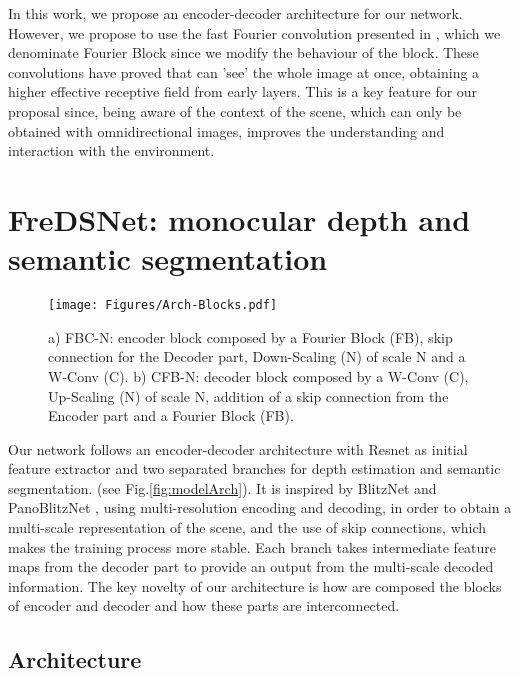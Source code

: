 \documentclass[letterpaper, 10 pt, conference]{ieeeconf}
\renewcommand{\headrulewidth}{0pt}
\renewcommand{\footrulewidth}{1pt}
\begin{document}
In this work, we propose an encoder-decoder architecture for our network. However, we propose to use the fast Fourier convolution presented in \cite{chi2020fast}, which we denominate Fourier Block since we modify the behaviour of the block. These convolutions have proved that can 'see' the whole image at once, obtaining a higher effective receptive field from early layers. This is a key feature for our proposal since, being aware of the context of the scene, which can only be obtained with omnidirectional images, improves the understanding and interaction with the environment. 

\fancyhf{}
\renewcommand{\headrulewidth}{0pt}
\renewcommand{\footrulewidth}{1pt}
\cfoot{\thepage}

\thispagestyle{fancy}

\section{FreDSNet: monocular depth and semantic segmentation}
\label{sec:method}

\begin{figure*}[t]
	\centering
	\texttt{[image: Figures/Arch-Blocks.pdf]}
	\caption{a) FBC-N: encoder block composed by a Fourier Block (FB), skip connection for the Decoder part, Down-Scaling (N) of scale N and a W-Conv (C). b) CFB-N: decoder block composed by a W-Conv (C), Up-Scaling (N) of scale N, addition of a skip connection from the Encoder part and a Fourier Block (FB).}
	\label{fig:modelBlocks}
\end{figure*}

Our network follows an encoder-decoder architecture with Resnet \cite{he2016deep} as initial feature extractor and two separated branches for depth estimation and semantic segmentation. (see Fig.\ref{fig:modelArch}). 
It is inspired by BlitzNet \cite{dvornik2017blitznet} and PanoBlitzNet \cite{guerrero2020s}, using multi-resolution encoding and decoding, in order to obtain a multi-scale representation of the scene, and the use of skip connections, which makes the training process more stable.
Each branch takes intermediate feature maps from the decoder part to provide an output from the multi-scale decoded information. The key novelty of our architecture is how are composed the blocks of encoder and decoder and how these parts are interconnected.

\subsection{Architecture} 
\end{document}

